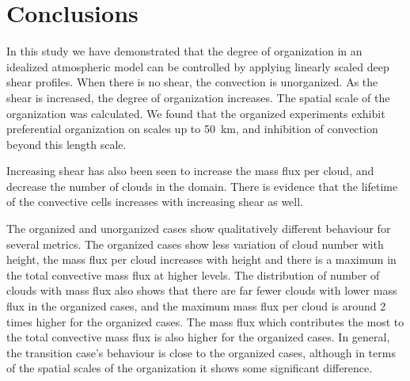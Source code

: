 \documentclass[11pt,a4paper]{article}
\newcommand\todo[1]{\textbf{TODO: #1}}
\begin{document}

\section{Conclusions}
%

In this study we have demonstrated that the degree of organization in an idealized atmospheric model can be controlled by applying linearly scaled deep shear profiles. When there is no shear, the convection is unorganized. As the shear is increased, the degree of organization increases. The spatial scale of the organization was calculated. We found that the organized experiments exhibit preferential organization on scales up to \SI{50}{km}, and inhibition of convection beyond this length scale.

Increasing shear has also been seen to increase the mass flux per cloud, and decrease the number of clouds in the domain. There is evidence that the lifetime of the convective cells increases with increasing shear as well.

The organized and unorganized cases show qualitatively different behaviour for several metrics. The organized cases show less variation of cloud number with height, the mass flux per cloud increases with height and there is a maximum in the total convective mass flux at higher levels. The distribution of number of clouds with mass flux also shows that there are far fewer clouds with lower mass flux in the organized cases, and the maximum mass flux per cloud is around 2 times higher for the organized cases. The mass flux which contributes the most to the total convective mass flux is also higher for the organized cases. In general, the transition case's behaviour is close to the organized cases, although in terms of the spatial scales of the organization it shows some significant difference.
\end{document}
